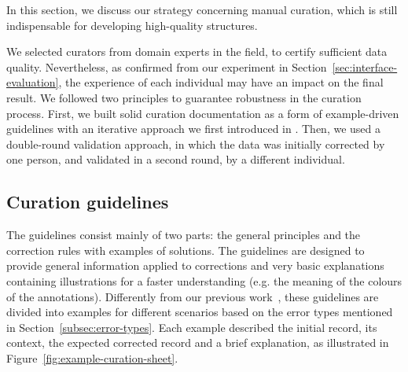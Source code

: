 \documentclass[]{interact}
\theoremstyle{plain} %
\theoremstyle{definition}
\theoremstyle{remark}
\begin{document}
In this section, we discuss our strategy concerning manual curation, which is still indispensable for developing high-quality structures. 

We selected curators from domain experts in the field, to certify sufficient data quality. 
Nevertheless, as confirmed from our experiment in Section~\ref{sec:interface-evaluation}, the experience of each individual may have an impact on the final result.
We followed two principles to guarantee robustness in the curation process. 
First, we built solid curation documentation as a form of example-driven guidelines with an iterative approach we first introduced in \cite{foppiano2021supermat}. 
Then, we used a double-round validation approach, in which the data was initially corrected by one person, and validated in a second round, by a different individual. 



\subsection{Curation guidelines}
\label{subsec:curation-guidelines}

The guidelines consist mainly of two parts: the general principles and the correction rules with examples of solutions.
The guidelines are designed to provide general information applied to corrections and very basic explanations containing illustrations for a faster understanding (e.g. the meaning of the colours of the annotations). 
Differently from our previous work~\cite{foppiano2021supermat}, these guidelines are divided into examples for different scenarios based on the error types mentioned in Section~\ref{subsec:error-types}.
Each example described the initial record, its context, the expected corrected record and a brief explanation, as illustrated in Figure~\ref{fig:example-curation-sheet}. 
\end{document}
